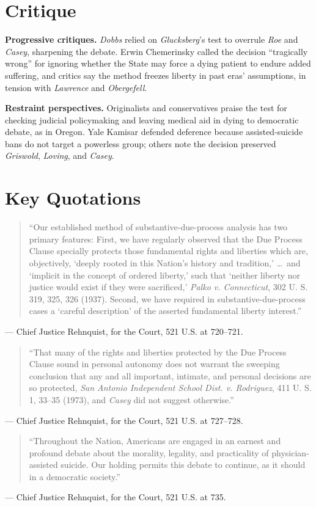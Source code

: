 \documentclass[12pt]{article}
\begin{document}
\section{Critique}

\textbf{Progressive critiques.} \textit{Dobbs} relied on \textit{Glucksberg}'s test to overrule \textit{Roe} and \textit{Casey}, sharpening the debate. Erwin Chemerinsky called the decision ``tragically wrong'' for ignoring whether the State may force a dying patient to endure added suffering, and critics say the method freezes liberty in past eras' assumptions, in tension with \textit{Lawrence} and \textit{Obergefell}.

\textbf{Restraint perspectives.} Originalists and conservatives praise the test for checking judicial policymaking and leaving medical aid in dying to democratic debate, as in Oregon. Yale Kamisar defended deference because assisted-suicide bans do not target a powerless group; others note the decision preserved \textit{Griswold}, \textit{Loving}, and \textit{Casey}.

\section{Key Quotations}

\begin{quote}
``Our established method of substantive-due-process analysis has two primary features: First, we have regularly observed that the Due Process Clause specially protects those fundamental rights and liberties which are, objectively, `deeply rooted in this Nation's history and tradition,' \ldots\ and `implicit in the concept of ordered liberty,' such that `neither liberty nor justice would exist if they were sacrificed,' \textit{Palko v. Connecticut}, 302 U. S. 319, 325, 326 (1937). Second, we have required in substantive-due-process cases a `careful description' of the asserted fundamental liberty interest.''
\end{quote}
\noindent --- Chief Justice Rehnquist, for the Court, 521 U.S. at 720--721.

\begin{quote}
``That many of the rights and liberties protected by the Due Process Clause sound in personal autonomy does not warrant the sweeping conclusion that any and all important, intimate, and personal decisions are so protected, \textit{San Antonio Independent School Dist. v. Rodriguez}, 411 U. S. 1, 33--35 (1973), and \textit{Casey} did not suggest otherwise.''
\end{quote}
\noindent --- Chief Justice Rehnquist, for the Court, 521 U.S. at 727--728.

\begin{quote}
``Throughout the Nation, Americans are engaged in an earnest and profound debate about the morality, legality, and practicality of physician-assisted suicide. Our holding permits this debate to continue, as it should in a democratic society.''
\end{quote}
\noindent --- Chief Justice Rehnquist, for the Court, 521 U.S. at 735.
\end{document}
